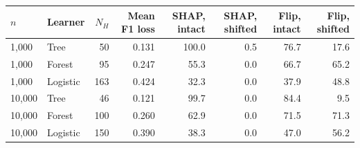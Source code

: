 \begin{tabular}{llrrrrrr}
\toprule
$n$ & Learner & $N_H$ & Mean F1 loss & SHAP, intact & SHAP, shifted & Flip, intact & Flip, shifted \\
\midrule
1,000 & Tree & 50 & 0.131 & 100.0 & 0.5 & 76.7 & 17.6 \\
1,000 & Forest & 95 & 0.247 & 55.3 & 0.0 & 66.7 & 65.2 \\
1,000 & Logistic & 163 & 0.424 & 32.3 & 0.0 & 37.9 & 48.8 \\
10,000 & Tree & 46 & 0.121 & 99.7 & 0.0 & 84.4 & 9.5 \\
10,000 & Forest & 100 & 0.260 & 62.9 & 0.0 & 71.5 & 71.3 \\
10,000 & Logistic & 150 & 0.390 & 38.3 & 0.0 & 47.0 & 56.2 \\
\bottomrule
\end{tabular}
